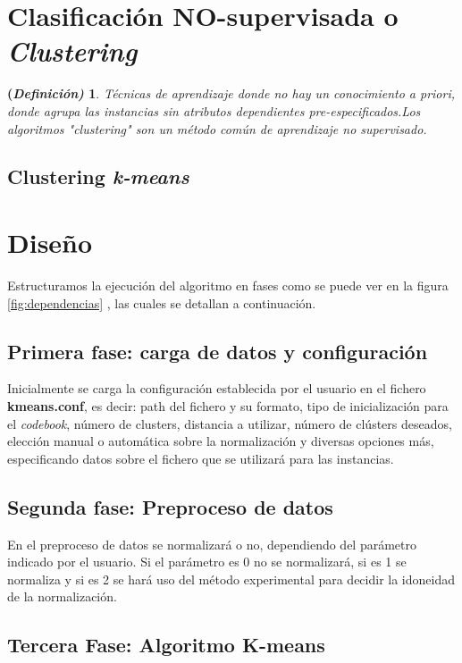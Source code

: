 \documentclass[10pt,a4paper]{article}
\newtheorem{defi}{(\it Definición)}[section]%
\begin{document}
\section{Clasificación \textbf{NO-supervisada} o \textit{Clustering}}

\begin{defi}
	Técnicas de aprendizaje donde no hay un conocimiento a priori, donde agrupa las instancias sin atributos dependientes pre-especificados.Los algoritmos "clustering" son un método común de aprendizaje no supervisado.
\end{defi}

\subsection{Clustering \textit{\textbf{k-means}}}


\section{Diseño}
 
 Estructuramos la ejecución del algoritmo en fases como se puede ver en la figura \ref{fig:dependencias} , las cuales se detallan a continuación.\\
 
\subsection*{Primera fase: carga de datos y configuración}
 
 Inicialmente se carga la configuración
 establecida por el usuario en el fichero \textbf{kmeans.conf}, es decir: path
 del fichero y su formato, tipo de inicialización para el \textit{codebook}, número de clusters, distancia a
 utilizar, número de clústers deseados, elección manual o automática sobre la
 normalización y diversas opciones más, especificando datos sobre el fichero que
 se utilizará para las instancias.

\subsection*{Segunda fase: Preproceso de datos}

En el preproceso de datos se normalizará o no, dependiendo del parámetro
indicado por el usuario. Si el parámetro es 0 no se normalizará, si es 1 se
normaliza y si es 2 se hará uso del método experimental para decidir la
idoneidad de la normalización.

\subsection*{Tercera Fase: Algoritmo K-means}
\end{document}
